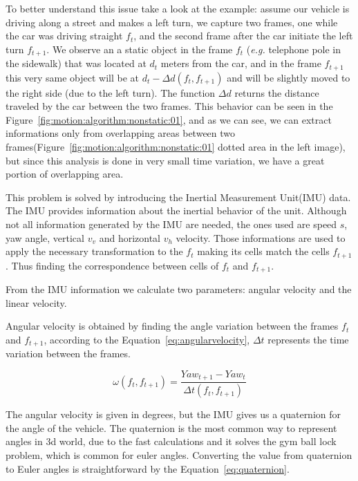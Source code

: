 To better understand this issue take a look at the example: assume our vehicle is driving along a street and makes a left turn, we capture two frames, one while the car was driving straight $f_t$, and the second frame  after the car initiate the left turn $f_{t+1}$. We observe an a static object in the frame $f_t$ (\textit{e.g.} telephone pole in the sidewalk) that was located at $d_t$ meters from the car, and in the frame $f_{t+1}$ this very same object will be at $d_t-\Delta d(f_t,f_{t+1})$ and will be slightly moved to the right side (due to the left turn). The function $\Delta d$ returns the distance traveled by the car between the two frames. This behavior can be seen in the Figure~\ref{fig:motion:algorithm:nonstatic:01}, and as we can see, we can extract informations only from overlapping areas between two frames(Figure~\ref{fig:motion:algorithm:nonstatic:01} dotted area in the left image), but since this analysis is done in very small time variation, we have a great portion of overlapping area.

This problem is solved by introducing the Inertial Measurement Unit(IMU) data. The IMU provides information about the inertial behavior of the unit. Although not all information generated by the IMU are needed, the ones used are speed $s$, yaw angle, vertical $v_v$ and horizontal $v_h$ velocity. Those informations are used to apply the necessary transformation to the $f_t$ making its cells match the cells $f_{t+1}$. Thus finding the correspondence between cells of $f_t$ and $f_{t+1}$.

From the IMU information we calculate two parameters: angular velocity and the linear velocity. 

Angular velocity is obtained by finding the angle variation between the frames $f_t$ and $f_{t+1}$, according to the Equation~\ref{eq:angularvelocity}, $\Delta t$ represents the time variation between the frames.

\begin{equation}
\label{eq:angularvelocity}
\omega(f_t,f_{t+1}) = \frac{Yaw_{t+1}-Yaw_t}{\Delta t(f_t,f_{t+1})} 
\end{equation} 

The angular velocity is given in degrees, but the IMU gives us a quaternion for the angle of the vehicle. The quaternion is the most common way to represent angles in 3d world, due to the fast calculations and it solves the gym ball lock problem, which is common for euler angles. Converting the value from quaternion to Euler angles is straightforward by the Equation~\ref{eq:quaternion}.

